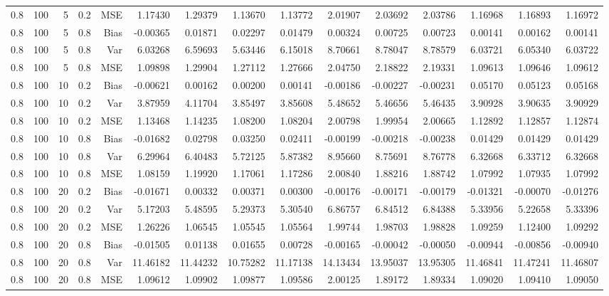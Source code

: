 \begin{table}[!htbp]
\begin{tabular}{lrrrrrrrrrrrrrr}
0.8 & 100 &  5 & 0.2 & MSE & 1.17430 & 1.29379 & 1.13670 & 1.13772 & 2.01907 & 2.03692 & 2.03786 & 1.16968 & 1.16893 & 1.16972 \\
0.8 & 100 &  5 & 0.8 & Bias & -0.00365 & 0.01871 & 0.02297 & 0.01479 & 0.00324 & 0.00725 & 0.00723 & 0.00141 & 0.00162 & 0.00141 \\
0.8 & 100 &  5 & 0.8 & Var & 6.03268 & 6.59693 & 5.63446 & 6.15018 & 8.70661 & 8.78047 & 8.78579 & 6.03721 & 6.05340 & 6.03722 \\
0.8 & 100 &  5 & 0.8 & MSE & 1.09898 & 1.29904 & 1.27112 & 1.27666 & 2.04750 & 2.18822 & 2.19331 & 1.09613 & 1.09646 & 1.09612 \\
0.8 & 100 & 10 & 0.2 & Bias & -0.00621 & 0.00162 & 0.00200 & 0.00141 & -0.00186 & -0.00227 & -0.00231 & 0.05170 & 0.05123 & 0.05168 \\
0.8 & 100 & 10 & 0.2 & Var & 3.87959 & 4.11704 & 3.85497 & 3.85608 & 5.48652 & 5.46656 & 5.46435 & 3.90928 & 3.90635 & 3.90929 \\
0.8 & 100 & 10 & 0.2 & MSE & 1.13468 & 1.14235 & 1.08200 & 1.08204 & 2.00798 & 1.99954 & 2.00665 & 1.12892 & 1.12857 & 1.12874 \\
0.8 & 100 & 10 & 0.8 & Bias & -0.01682 & 0.02798 & 0.03250 & 0.02411 & -0.00199 & -0.00218 & -0.00238 & 0.01429 & 0.01429 & 0.01429 \\
0.8 & 100 & 10 & 0.8 & Var & 6.29964 & 6.40483 & 5.72125 & 5.87382 & 8.95660 & 8.75691 & 8.76778 & 6.32668 & 6.33712 & 6.32668 \\
0.8 & 100 & 10 & 0.8 & MSE & 1.08159 & 1.19920 & 1.17061 & 1.17286 & 2.00840 & 1.88216 & 1.88742 & 1.07992 & 1.07935 & 1.07992 \\
0.8 & 100 & 20 & 0.2 & Bias & -0.01671 & 0.00332 & 0.00371 & 0.00300 & -0.00176 & -0.00171 & -0.00179 & -0.01321 & -0.00070 & -0.01276 \\
0.8 & 100 & 20 & 0.2 & Var & 5.17203 & 5.48595 & 5.29373 & 5.30540 & 6.86757 & 6.84512 & 6.84388 & 5.33956 & 5.22658 & 5.33396 \\
0.8 & 100 & 20 & 0.2 & MSE & 1.26226 & 1.06545 & 1.05545 & 1.05564 & 1.99744 & 1.98703 & 1.98828 & 1.09259 & 1.12400 & 1.09292 \\
0.8 & 100 & 20 & 0.8 & Bias & -0.01505 & 0.01138 & 0.01655 & 0.00728 & -0.00165 & -0.00042 & -0.00050 & -0.00944 & -0.00856 & -0.00940 \\
0.8 & 100 & 20 & 0.8 & Var & 11.46182 & 11.44232 & 10.75282 & 11.17138 & 14.13434 & 13.95037 & 13.95305 & 11.46841 & 11.47241 & 11.46807 \\
0.8 & 100 & 20 & 0.8 & MSE & 1.09612 & 1.09902 & 1.09877 & 1.09586 & 2.00125 & 1.89172 & 1.89334 & 1.09020 & 1.09410 & 1.09050 \\

\end{tabular}
\end{table}
